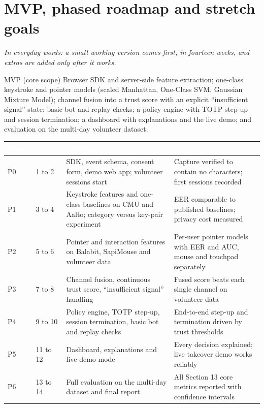 \documentclass[10pt,letterpaper]{article}
\newcommand{\hd}[1]{\textcolor{white}{\bfseries #1}}
\newcommand{\headrow}{\rowcolor{navy}}
\begin{document}
\section{MVP, phased roadmap and stretch goals}

\emph{In everyday words: a small working version comes first, in fourteen weeks, and extras are added only after it works.}

\begin{callout}{MVP (core scope)}
Browser SDK and server-side feature extraction; one-class keystroke and pointer models (scaled Manhattan, One-Class SVM, Gaussian Mixture Model); channel fusion into a trust score with an explicit ``insufficient signal'' state; basic bot and replay checks; a policy engine with TOTP step-up and session termination; a dashboard with explanations and the live demo; and evaluation on the multi-day volunteer dataset.
\end{callout}

\begin{xltabular}{\textwidth}{P{0.9cm} P{1.5cm} L L}
\headrow \hd{Phase} & \hd{Weeks} & \hd{Deliverable} & \hd{Success criterion} \\
\endhead
P0 & 1 to 2 & SDK, event schema, consent form, demo web app; volunteer sessions start & Capture verified to contain no characters; first sessions recorded \\ \hline
P1 & 3 to 4 & Keystroke features and one-class baselines on CMU and Aalto; category versus key-pair experiment & EER comparable to published baselines; privacy cost measured \\ \hline
P2 & 5 to 6 & Pointer and interaction features on Balabit, SapiMouse and volunteer data & Per-user pointer models with EER and AUC, mouse and touchpad separately \\ \hline
P3 & 7 to 8 & Channel fusion, continuous trust score, ``insufficient signal'' handling & Fused score beats each single channel on volunteer data \\ \hline
P4 & 9 to 10 & Policy engine, TOTP step-up, session termination, basic bot and replay checks & End-to-end step-up and termination driven by trust thresholds \\ \hline
P5 & 11 to 12 & Dashboard, explanations and live demo mode & Every decision explained; live takeover demo works reliably \\ \hline
P6 & 13 to 14 & Full evaluation on the multi-day dataset and final report & All Section 13 core metrics reported with confidence intervals \\
\end{xltabular}
\end{document}
